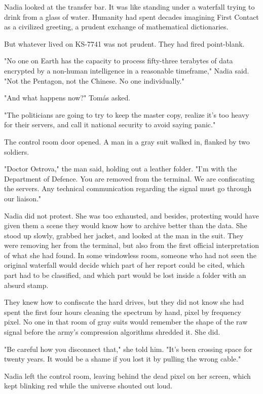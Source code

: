 \documentclass[11pt,a5paper,twoside]{book}
\begin{document}
Nadia looked at the transfer bar. It was like standing under a waterfall trying to drink from a glass of water. Humanity had spent decades imagining First Contact as a civilized greeting, a prudent exchange of mathematical dictionaries.

But whatever lived on KS-7741 was not prudent. They had fired point-blank.

"No one on Earth has the capacity to process fifty-three terabytes of data encrypted by a non-human intelligence in a reasonable timeframe," Nadia said. "Not the Pentagon, not the Chinese. No one individually."

"And what happens now?" Tomás asked.

"The politicians are going to try to keep the master copy, realize it's too heavy for their servers, and call it national security to avoid saying panic."

The control room door opened. A man in a gray suit walked in, flanked by two soldiers.

"Doctor Ostrova," the man said, holding out a leather folder. "I'm with the Department of Defence. You are removed from the terminal. We are confiscating the servers. Any technical communication regarding the signal must go through our liaison."

Nadia did not protest. She was too exhausted, and besides, protesting would have given them a scene they would know how to archive better than the data. She stood up slowly, grabbed her jacket, and looked at the man in the suit. They were removing her from the terminal, but also from the first official interpretation of what she had found. In some windowless room, someone who had not seen the original waterfall would decide which part of her report could be cited, which part had to be classified, and which part would be lost inside a folder with an absurd stamp.

They knew how to confiscate the hard drives, but they did not know she had spent the first four hours cleaning the spectrum by hand, pixel by frequency pixel. No one in that room of gray suits would remember the shape of the raw signal before the army's compression algorithms shredded it. She did.

"Be careful how you disconnect that," she told him. "It's been crossing space for twenty years. It would be a shame if you lost it by pulling the wrong cable."

Nadia left the control room, leaving behind the dead pixel on her screen, which kept blinking red while the universe shouted out loud.
\end{document}
